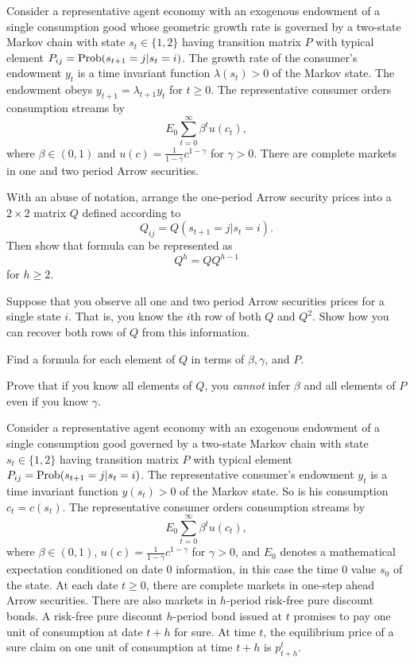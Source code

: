 %
\medskip

 
\medskip
\noindent Consider a representative agent economy with an exogenous endowment of a single consumption good whose geometric growth rate is
governed by  a two-state Markov chain
with state $s_t \in \{ 1, 2\}$ having transition  matrix $P$ with typical element $P_{ij} = {\rm Prob} (s_{t+1} = j | s_t = i)$.
The growth rate of the consumer's endowment $y_t$ is a time invariant function  $\lambda(s_t)> 0$ of the Markov state.
The endowment obeys $y_{t+1} = \lambda_{t+1} y_t$ for $t \geq 0$.
The representative consumer orders consumption streams by
$$ E_0 \sum_{t=0}^\infty \beta^t u(c_t), $$
where $\beta \in (0,1)$ and $u(c)= {\frac{1}{1-\gamma}}c^{1-\gamma}$ for $\gamma > 0$.
There are complete markets in one and two period Arrow securities.


\medskip
{} With an abuse of notation, arrange the one-period Arrow security prices into a $2 \times 2$ matrix $Q$ defined
according to
$$ Q_{ij} = Q(s_{t+1} = j| s_t = i). $$
Then show that formula  can be represented as
$$ Q^h = Q Q^{h-1} $$
for $h \geq 2$.


\medskip
{}  Suppose that you observe all one and two period  Arrow securities prices for a single state $i$.  That is,
you know the $i$th row of both $Q$ and $Q^2$.  Show how you can recover both rows of $Q$ from this information.


\medskip
{}  Find a formula for each element of $Q$  in terms of $\beta, \gamma$, and $P$.

\medskip
{}   Prove that if you  know all elements of $Q$, you {\it cannot} infer $\beta$ and all elements of $P$ even if you know  $\gamma$.


\medskip

 
\medskip
\noindent Consider a representative agent economy with an exogenous endowment of a single consumption good governed by a two-state Markov chain
with state $s_t \in \{ 1, 2\}$ having transition  matrix $P$ with typical element $P_{ij} = {\rm Prob} (s_{t+1} = j | s_t = i)$.
The representative consumer's endowment $y_t$ is a time invariant function  $y(s_t)> 0$ of the Markov state. So is his consumption $c_t = c(s_t)$.
The representative consumer orders consumption streams by
$$ E_0 \sum_{t=0}^\infty \beta^t u(c_t), $$
where $\beta \in (0,1)$,  $u(c)= {\frac{1}{1-\gamma}}c^{1-\gamma}$ for $\gamma > 0$, and $E_0$ denotes a mathematical expectation conditioned on date
$0$ information, in this case the time $0$ value  $s_0$ of the state.
At each date $t \geq 0$, there are complete markets in one-step ahead Arrow securities.
There are also markets in $h$-period risk-free pure discount  bonds.  A risk-free pure discount $h$-period bond issued at $t$ promises to pay one unit of
consumption at date $t+h$ for sure.  At time $t$, the equilibrium price of a sure claim on one unit of  consumption
at time $t+h$ is $p^t_{t+h}$.

